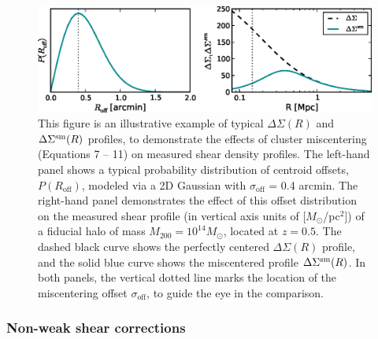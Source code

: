 \begin{figure}
\begin{center}
  \includegraphics[scale=1.0]{plots_ch4/PofRc_DeltaSigma_example.eps}
  \caption[Example of Miscentering Effect on Shear Profile]{This figure is an illustrative example of typical $\Delta\Sigma(R)$ and $\Delta\Sigma^{\rm sm}(R)$ profiles, to demonstrate the effects of cluster miscentering (Equations 7 -- 11) on measured shear density profiles. The left-hand panel shows a typical probability distribution of centroid offsets, $P(R_{\mathrm{off}})$, modeled via a 2D Gaussian with $\sigma_{\mathrm{off}}$ = 0.4 arcmin. The right-hand panel demonstrates the effect of this offset distribution on the measured shear profile (in vertical axis units of [$M_{\odot}$/pc$^2$]) of a fiducial halo of mass $M_{200}=10^{14} M_{\odot}$, located at $z=0.5$. The dashed black curve shows the perfectly centered $\Delta\Sigma(R)$ profile, and the solid blue curve shows the miscentered profile $\Delta\Sigma^{\rm sm}(R)$. In both panels, the vertical dotted line marks the location of the miscentering offset $\sigma_{\mathrm{off}}$, to guide the eye in the comparison.}
\label{plot:miscentering4}
\end{center}
\end{figure}


\subsubsection{Non-weak shear corrections}

